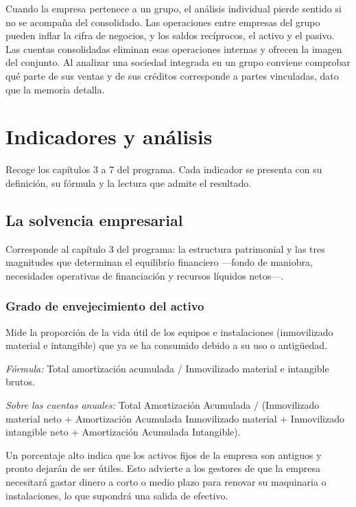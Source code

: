 \documentclass[12pt]{book} %
\begin{document}
Cuando la empresa pertenece a un grupo, el análisis individual pierde
sentido si no se acompaña del consolidado. Las operaciones entre
empresas del grupo pueden inflar la cifra de negocios, y los saldos
recíprocos, el activo y el pasivo. Las cuentas consolidadas eliminan
esas operaciones internas y ofrecen la imagen del conjunto. Al analizar
una sociedad integrada en un grupo conviene comprobar qué parte de sus
ventas y de sus créditos corresponde a partes vinculadas, dato que la
memoria detalla.

\hypertarget{indicadores-y-anuxe1lisis}{%
\chapter{Indicadores y análisis}\label{indicadores-y-anuxe1lisis}}

Recoge los capítulos 3 a 7 del programa. Cada indicador se presenta con
su definición, su fórmula y la lectura que admite el resultado.

\hypertarget{la-solvencia-empresarial}{%
\section{La solvencia empresarial}\label{la-solvencia-empresarial}}

Corresponde al capítulo 3 del programa: la estructura patrimonial y las
tres magnitudes que determinan el equilibrio financiero ---fondo de
maniobra, necesidades operativas de financiación y recursos líquidos
netos---.

\hypertarget{grado-de-envejecimiento-del-activo}{%
\subsection{Grado de envejecimiento del
activo}\label{grado-de-envejecimiento-del-activo}}

Mide la proporción de la vida útil de los equipos e instalaciones
(inmovilizado material e intangible) que ya se ha consumido debido a su
uso o antigüedad.

\emph{Fórmula:} Total amortización acumulada / Inmovilizado material e
intangible brutos.

\emph{Sobre las cuentas anuales:} Total Amortización Acumulada /
(Inmovilizado material neto + Amortización Acumulada Inmovilizado
material + Inmovilizado intangible neto + Amortización Acumulada
Intangible).

Un porcentaje alto indica que los activos fijos de la empresa son
antiguos y pronto dejarán de ser útiles. Esto advierte a los gestores de
que la empresa necesitará gastar dinero a corto o medio plazo para
renovar su maquinaria o instalaciones, lo que supondrá una salida de
efectivo.
\end{document}
